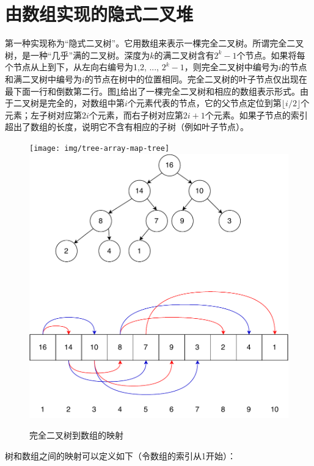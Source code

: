 \documentclass[b5paper]{ctexart}
\begin{document}
\section{由数组实现的隐式二叉堆}
\label{ibheap}  

第一种实现称为“隐式二叉树”。它用数组来表示一棵完全二叉树。所谓完全二叉树，是一种“几乎”满的二叉树。深度为$k$的满二叉树含有$2^k-1$个节点。如果将每个节点从上到下，从左向右编号为1,2, ..., $2^k - 1$，则完全二叉树中编号为$i$的节点和满二叉树中编号为$i$的节点在树中的位置相同。完全二叉树的叶子节点仅出现在最下面一行和倒数第二行。图\ref{fig:tree-array-map}给出了一棵完全二叉树和相应的数组表示形式。由于二叉树是完全的，对数组中第$i$个元素代表的节点，它的父节点定位到第$\lfloor i/2 \rfloor$个元素；左子树对应第$2i$个元素，而右子树对应第$2i+1$个元素。如果子节点的索引超出了数组的长度，说明它不含有相应的子树（例如叶子节点）。

\begin{figure}[htbp]
\centering
   \texttt{[image: img/tree-array-map-tree]}
   \includegraphics[scale=0.5]{img/binary-tree-in-array}
 \caption{完全二叉树到数组的映射} \label{fig:tree-array-map}
\end{figure}

树和数组之间的映射可以定义如下（令数组的索引从1开始）：
\end{document}
